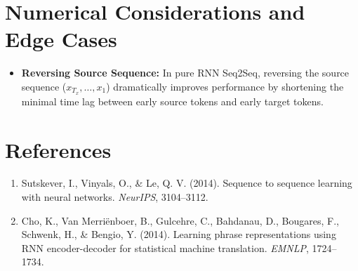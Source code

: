 \documentclass[11pt,a4paper]{article}
\theoremstyle{definition}
\begin{document}
\section{Numerical Considerations and Edge Cases}

\begin{itemize}
    \item \textbf{Reversing Source Sequence:} In pure RNN Seq2Seq, reversing the source sequence ($x_{T_x}, \dots, x_1$) dramatically improves performance by shortening the minimal time lag between early source tokens and early target tokens.
\end{itemize}

\section{References}
\begin{enumerate}
    \item Sutskever, I., Vinyals, O., & Le, Q. V. (2014). Sequence to sequence learning with neural networks. \emph{NeurIPS}, 3104--3112.
    \item Cho, K., Van Merri{\"e}nboer, B., Gulcehre, C., Bahdanau, D., Bougares, F., Schwenk, H., & Bengio, Y. (2014). Learning phrase representations using RNN encoder-decoder for statistical machine translation. \emph{EMNLP}, 1724--1734.
\end{enumerate}
\end{document}
